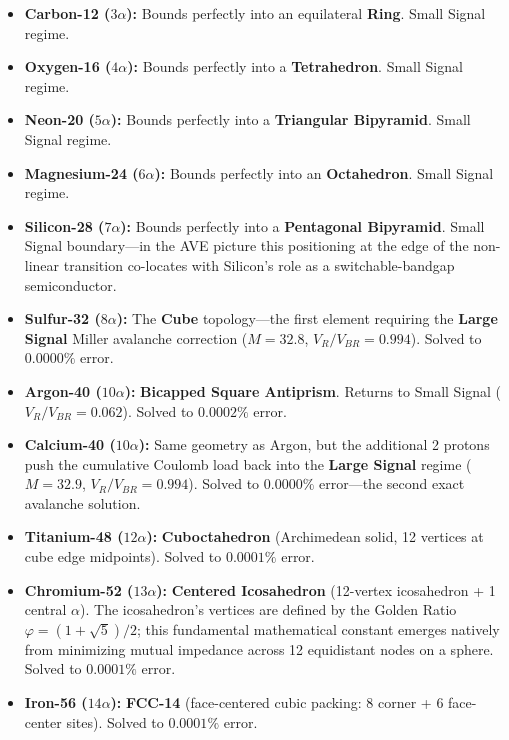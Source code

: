 \begin{itemize}
    \item \textbf{Carbon-12 ($3\alpha$):} Bounds perfectly into an equilateral \textbf{Ring}. Small Signal regime.
    \item \textbf{Oxygen-16 ($4\alpha$):} Bounds perfectly into a \textbf{Tetrahedron}. Small Signal regime.
    \item \textbf{Neon-20 ($5\alpha$):} Bounds perfectly into a \textbf{Triangular Bipyramid}. Small Signal regime.
    \item \textbf{Magnesium-24 ($6\alpha$):} Bounds perfectly into an \textbf{Octahedron}. Small Signal regime.
    \item \textbf{Silicon-28 ($7\alpha$):} Bounds perfectly into a \textbf{Pentagonal Bipyramid}. Small Signal boundary---in the AVE picture this positioning at the edge of the non-linear transition co-locates with Silicon's role as a switchable-bandgap semiconductor.
    \item \textbf{Sulfur-32 ($8\alpha$):} The \textbf{Cube} topology---the first element requiring the \textbf{Large Signal} Miller avalanche correction ($M = 32.8$, $V_R/V_{BR} = 0.994$). Solved to $0.0000\%$ error.
    \item \textbf{Argon-40 ($10\alpha$):} \textbf{Bicapped Square Antiprism}. Returns to Small Signal ($V_R/V_{BR} = 0.062$). Solved to $0.0002\%$ error.
    \item \textbf{Calcium-40 ($10\alpha$):} Same geometry as Argon, but the additional 2 protons push the cumulative Coulomb load back into the \textbf{Large Signal} regime ($M = 32.9$, $V_R/V_{BR} = 0.994$). Solved to $0.0000\%$ error---the second exact avalanche solution.
    \item \textbf{Titanium-48 ($12\alpha$):} \textbf{Cuboctahedron} (Archimedean solid, 12 vertices at cube edge midpoints). Solved to $0.0001\%$ error.
    \item \textbf{Chromium-52 ($13\alpha$):} \textbf{Centered Icosahedron} (12-vertex icosahedron + 1 central $\alpha$). The icosahedron's vertices are defined by the Golden Ratio $\varphi = (1+\sqrt{5})/2$; this fundamental mathematical constant emerges natively from minimizing mutual impedance across 12 equidistant nodes on a sphere. Solved to $0.0001\%$ error.
    \item \textbf{Iron-56 ($14\alpha$):} \textbf{FCC-14} (face-centered cubic packing: 8 corner + 6 face-center sites). Solved to $0.0001\%$ error.
\end{itemize}

